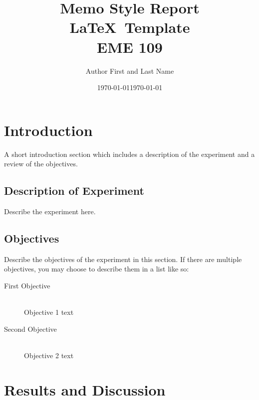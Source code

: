 \documentclass[12pt,letterpaper]{article}
\title{Memo Style Report \\ \LaTeX\ Template \\ EME 109} 	%
\author{Author First and Last Name}				%
\date{\today}									    %
\title{\thetitle}
\author{\theauthor}
\date{\today}
\begin{document}
\maketitle %


\section{Introduction}

A short introduction section which includes a description of the experiment and a review of the objectives.

\subsection{Description of Experiment}
Describe the experiment here. 

\subsection{Objectives}
Describe the objectives of the experiment in this section.  If there are multiple objectives, you may choose to describe them in a list like so:
\begin{description}
	\item[First Objective] \hfill \\
	Objective 1 text

	\item[Second Objective] \hfill \\
	Objective 2 text
\end{description}



\section{Results and Discussion}
\end{document}
